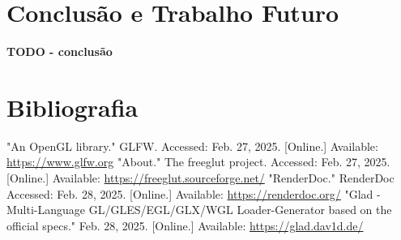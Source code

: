 \documentclass[12pt, a4paper]{article}
\begin{document}
\section{Conclusão e Trabalho Futuro}

\textbf{\color{red} TODO - conclusão}

\begingroup
\section{Bibliografia}
\renewcommand{\section}[2]{}

\begin{thebibliography}{9}
        "An OpenGL library."{} GLFW. Accessed: Feb. 27, 2025. [Online.] Available:
        \url{https://www.glfw.org}
        "About."{} The freeglut project. Accessed: Feb. 27, 2025. [Online.] Available:
        \url{https://freeglut.sourceforge.net/}
        "RenderDoc."{} RenderDoc Accessed: Feb. 28, 2025. [Online.] Available:
        \url{https://renderdoc.org/}
        "Glad - Multi-Language GL/GLES/EGL/GLX/WGL Loader-Generator based on the official specs."{}
        Feb. 28, 2025. [Online.] Available: \url{https://glad.dav1d.de/}
\end{thebibliography}
\endgroup
\end{document}
